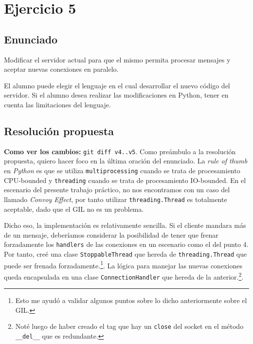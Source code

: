\documentclass{article}
\begin{document}
\section{Ejercicio 5}

\subsection{Enunciado}
Modificar el servidor actual para que el mismo permita procesar mensajes y aceptar nuevas conexiones en paralelo.

El alumno puede elegir el lenguaje en el cual desarrollar el nuevo código del servidor. Si el alumno desea realizar las modificaciones en Python, tener en cuenta las limitaciones del lenguaje.

\subsection{Resolución propuesta}

\textbf{Como ver los cambios: }\texttt{git diff v4..v5}.
Como preámbulo a la resolución propuesta, quiero hacer foco en la última oración del enunciado. La \textit{rule of thumb} en \textit{Python} es que se utiliza \texttt{multiprocessing} cuando se trata de procesamiento CPU-bounded y \texttt{threading} cuando se trata de procesamiento IO-bounded. En el escenario del presente trabajo práctico, no nos encontramos con un caso del llamado \textit{Convoy Effect}\cite{ConvoyEffect}, por tanto utilizar \texttt{threading.Thread} es totalmente aceptable\cite{TTM}, dado que el GIL no es un problema.

Dicho eso, la implementación es relativamente sencilla. Si el cliente mandara más de un mensaje, deberíamos considerar la posibilidad de tener que frenar forzadamente los \texttt{handlers} de las conexiones en un escenario como el del punto 4. Por tanto, creé una clase \texttt{StoppableThread} que hereda de \texttt{threading.Thread} que puede ser frenada forzadamente.\footnote{Esto me ayudó a validar algunos puntos sobre lo dicho anteriormente sobre el GIL.}. La lógica para manejar las nuevas conexiones queda encapsulada en una clase \texttt{ConnectionHandler} que hereda de la anterior.\footnote{Noté luego de haber creado el tag que hay un \texttt{close} del socket en el método \texttt{\_\_del\_\_} que es redundante.}.

\printbibliography
\end{document}
